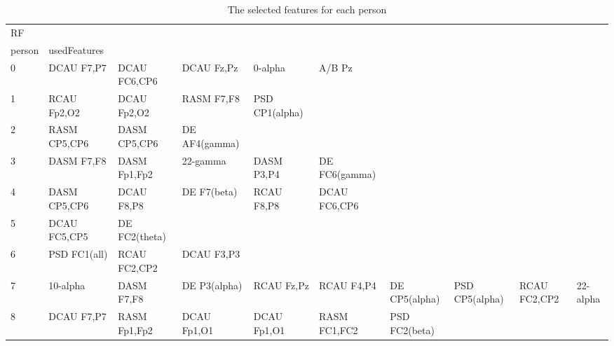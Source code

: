 \begin{landscape}
\begin{table}[]
\centering
\caption{The selected features for each person}
\begin{tabular}{l|llllllll}
RF       &                &                &                &                &                &                &                &                &               &              \\
person   & usedFeatures   &                &                &                &                &                &                &                &               &              \\
0        & DCAU F7,P7     & DCAU FC6,CP6   & DCAU Fz,Pz     & 0-alpha        & A/B Pz         &                &                &                &               &              \\
1        & RCAU Fp2,O2    & DCAU Fp2,O2    & RASM F7,F8     & PSD CP1(alpha) &                &                &                &                &               &              \\
2        & RASM CP5,CP6   & DASM CP5,CP6   & DE AF4(gamma)  &                &                &                &                &                &               &              \\
3        & DASM F7,F8     & DASM Fp1,Fp2   & 22-gamma       & DASM P3,P4     & DE FC6(gamma)  &                &                &                &               &              \\
4        & DASM CP5,CP6   & DCAU F8,P8     & DE F7(beta)    & RCAU F8,P8     & DCAU FC6,CP6   &                &                &                &               &              \\
5        & DCAU FC5,CP5   & DE FC2(theta)  &                &                &                &                &                &                &               &              \\
6        & PSD FC1(all)   & RCAU FC2,CP2   & DCAU F3,P3     &                &                &                &                &                &               &              \\
7        & 10-alpha       & DASM F7,F8     & DE P3(alpha)   & RCAU Fz,Pz     & RCAU F4,P4     & DE CP5(alpha)  & PSD CP5(alpha) & RCAU FC2,CP2   & 22-alpha      &              \\
8        & DCAU F7,P7     & RASM Fp1,Fp2   & DCAU Fp1,O1    & DCAU Fp1,O1    & RASM FC1,FC2   & PSD FC2(beta)  &                &                &               &              \\

\end{tabular}
\end{table}
\end{landscape}
